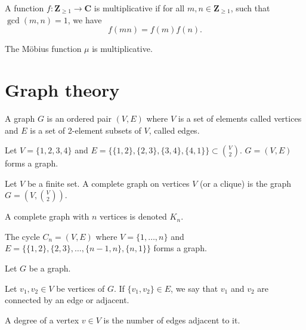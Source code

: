 \begin{definition} 
A function $f:\mathbf{Z}_{\ge 1}\to \mathbf{C}$ is multiplicative if for all $m,n\in \mathbf{Z}_{\ge 1}$, such that $\gcd(m,n)=1$, we have 
$$
f(mn)=f(m)f(n).
$$
\end{definition}
\begin{exercise}
The Möbius function $\mu$ is multiplicative.
\end{exercise}


\chapter{Graph theory}

\begin{definition}
A graph $G$ is an ordered pair $(V,E)$ where $V$ is a set of elements called vertices and $E$ is a set of 2-element subsets of $V$, called edges.
\end{definition}
\begin{example}
Let $V=\{ 1,2,3,4 \}$ and $E=\{ \{ 1,2 \},\{ 2,3 \},\{ 3,4 \},\{ 4,1 \} \}\subset \binom{ V}  {2 }$. $G=(V,E)$ forms a graph.
\end{example}
\begin{definition}
Let $V$ be a finite set. A complete graph on vertices $V$ (or a clique) is the graph $G=(V,\binom{ V}  {2 })$.

A complete graph with $n$ vertices is denoted $K_{n}$.
\end{definition}

\begin{definition}
The cycle $C_{n}=(V,E)$ where $V=\{ 1,\dots,n\}$ and $E=\{ \{ 1,2 \},\{ 2,3 \},\dots,\{ n-1,n\},\{ n,1 \} \}$ forms a graph.
\end{definition}

Let $G$ be a graph.
\begin{definition}
Let $v_{1},v_{2}\in V$ be vertices of $G$. If $\{ v_{1},v_{2} \}\in E$, we say that $v_{1}$ and $v_{2}$ are connected by an edge or adjacent.
\end{definition}
\begin{definition}
A degree of a vertex $v\in V$ is the number of edges adjacent to it.
\end{definition}

